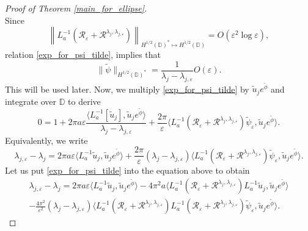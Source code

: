 \documentclass[12pt,a4paper]{amsart}
\numberwithin{equation}{section}
\theoremstyle{plain}
\theoremstyle{definition}
\begin{document}
\begin{proof}[Proof of Theorem \ref{main_for_ellipse}]
\begin{equation}
	\end{equation}
    Since 
    \begin{equation*}
        \left\| L_a^{-1}\left( \mathcal{R}_\varepsilon + \mathcal{R}^{\lambda_j,\lambda_{j,\varepsilon}}\right) \right\|_{H^{1/2}(\mathbb{D})^* \mapsto H^{1/2}(\mathbb{D})} = O(\varepsilon^2\log\varepsilon),
    \end{equation*}
    relation \eqref{exp_for_psi_tilde}, implies that 
    \begin{equation}\label{est_for_psi}
        \|\tilde{\psi}\|_{H^{1/2}(\mathbb D)^*} = \frac{1}{\lambda_j - \lambda_{j,\varepsilon}}O(\varepsilon).
    \end{equation}
    This will be used later. Now, we multiply \eqref{exp_for_psi_tilde} by $\tilde{u}_je^{\tilde{\phi}}$ and integrate over $\mathbb{D}$ to derive
	\begin{equation*}
		0 = 1 + 2\pi a\varepsilon\frac{\langle L_{a}^{-1}[\tilde{u}_j], \tilde{u}_je^{\tilde{\phi}}\rangle}{\lambda_j - \lambda_{j,\varepsilon}}  + \frac{2\pi}{\varepsilon}\langle L_{a}^{-1}\left( \mathcal{R}_\varepsilon + \mathcal{R}^{\lambda_j,\lambda_{j,\varepsilon}}\right) \tilde{\psi}_\varepsilon, \tilde{u}_j e^{\tilde{\phi}}\rangle.
	\end{equation*}
	Equivalently, we write 
	\begin{equation*}
		\lambda_{j,\varepsilon} - \lambda_j = 2\pi a\varepsilon \langle L_{a}^{-1}\tilde{u}_j, \tilde{u}_je^{\tilde{\phi}}\rangle + \frac{2\pi}{\varepsilon}(\lambda_j - \lambda_{j,\varepsilon})\langle L_{a}^{-1}\left( \mathcal{R}_\varepsilon + \mathcal{R}^{\lambda_j,\lambda_{j,\varepsilon}}\right) \tilde{\psi}_\varepsilon, \tilde{u}_je^{\tilde{\phi}}\rangle.
	\end{equation*}
	Let us put \eqref{exp_for_psi_tilde} into the equation above to obtain
	\begin{multline}\label{lminl}
		\lambda_{j,\varepsilon} - \lambda_j = 2\pi a\varepsilon \langle L_{a}^{-1}\tilde{u}_j, \tilde{u}_je^{\tilde{\phi}}\rangle - 4\pi^2 a \langle L_{a}^{-1}\left( \mathcal{R}_\varepsilon + \mathcal{R}^{\lambda_j,\lambda_{j,\varepsilon}}\right) L_{a}^{-1}\tilde{u}_j, \tilde{u}_je^{\tilde{\phi}}\rangle\\
		- \frac{4\pi^2}{\varepsilon^2} (\lambda_j - \lambda_{j,\varepsilon})\langle L_{a}^{-1}\left( \mathcal{R}_\varepsilon + \mathcal{R}^{\lambda_j,\lambda_{j,\varepsilon}}\right) L_{a}^{-1}\left( \mathcal{R}_\varepsilon + \mathcal{R}^{\lambda_j,\lambda_{j,\varepsilon}}\right) \tilde{\psi}_\varepsilon, \tilde{u}_je^{\tilde{\phi}}\rangle.

\end{multline}
\end{proof}
\end{document}
